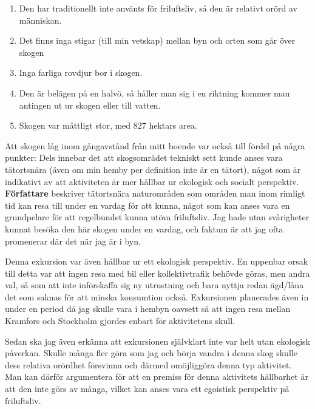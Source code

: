 \documentclass[12pt]{article}   %
\begin{document}
\begin{enumerate}
        \item Den har traditionellt inte använts för friluftsliv, så den är relativt orörd av människan.
        \item Det finns inga stigar (till min vetskap) mellan byn och orten som går över skogen\footnotemark{}
        \item Inga farliga rovdjur bor i skogen.\footnotemark{}
        \item Den är belägen på en halvö, så håller man sig i en riktning kommer man antingen ut ur skogen eller till vatten.
        \item Skogen var måttligt stor, med 827 hektars area.
\end{enumerate}

Att skogen låg inom gångavstånd från mitt boende var också till fördel på några punkter:
Dels innebar det att skogsområdet tekniskt sett kunde anses vara tätortsnära (även om min hemby per definition
inte är en tätort), något som är indikativt av att aktiviteten är mer hållbar ur ekologisk och socialt perspektiv.
\textbf{Författare} beskriver tätortsnära naturområden som områden man inom rimligt
tid kan resa till under en vardag för att kunna, något som kan anses vara en grundpelare för att
regelbundet kunna utöva friluftsliv\cite{fredman2013friluftsliv}. Jag hade utan svårigheter kunnat
besöka den här skogen under en vardag, och faktum är att jag ofta promenerar där det när jag är i byn.

Denna exkursion var även hållbar ur ett ekologisk perspektiv. En uppenbar orsak till detta var
att ingen resa med bil eller kollektivtrafik behövde göras, men andra val, så som att inte
införskaffa sig ny utrustning och bara nyttja redan ägd/låna det som saknas för att minska
konsumtion också. Exkursionen planerades även in under en period då jag skulle vara i hembyn
oavsett så att ingen resa mellan Kramfors och Stockholm gjordes enbart för aktivitetens skull.

Sedan ska jag även erkänna att exkursionen självklart inte var helt utan ekologisk påverkan.
Skulle många fler göra som jag och börja vandra i denna skog skulle dess relativa orördhet
försvinna och därmed omöjliggöra denna typ aktivitet. Man kan därför argumentera för att en premiss
för denna aktivitets hållbarhet är att den inte görs av många, vilket kan anses vara ett egoistisk
perspektiv på friluftsliv.

\pagebreak

\renewcommand{\refname}{Källor}


\end{document}
